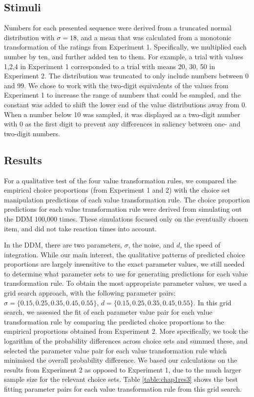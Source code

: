 \documentclass[11pt,a4paper]{article}
\begin{document}
\subsection{Stimuli}

Numbers for each presented sequence were derived from a truncated normal distribution with $\sigma=18$, and a mean that was calculated from a monotonic transformation of the ratings from Experiment 1. Specifically, we multiplied each number by ten, and further added ten to them. For example, a trial with values 1,2,4 in Experiment 1 corresponded to a trial with means 20, 30, 50 in Experiment 2. The distribution was truncated to only include numbers between 0 and 99. We chose to work with the two-digit equivalents of the values from Experiment 1 to increase the range of numbers that could be sampled, and the constant was added to shift the lower end of the value distributions away from 0. When a number below 10 was sampled, it was displayed as a two-digit number with 0 as the first digit to prevent any differences in saliency between one- and two-digit numbers.


\subsection{Results}

For a qualitative test of the four value transformation rules, we compared the empirical choice proportions (from Experiment 1 and 2) with the choice set manipulation predictions of each value transformation rule. The choice proportion predictions for each value transformation rule were derived from simulating out the DDM 100,000 times. These simulations focused only on the eventually chosen item, and did not take reaction times into account.

In the DDM, there are two parameters, $\sigma$, the noise, and $d$, the speed of integration. While our main interest, the qualitative patterns of predicted choice proportions are largely insensitive to the exact parameter values, we still needed to determine what parameter sets to use for generating predictions for each value transformation rule. To obtain the most appropriate parameter values, we used a grid search approach, with the following parameter pairs: $\sigma=\{0.15, 0.25, 0.35, 0.45, 0.55\}$, $\textit{d}=\{0.15, 0.25, 0.35, 0.45, 0.55\}$. In this grid search, we assessed the fit of each parameter value pair for each value transformation rule by comparing the predicted choice proportions to the empirical proportions obtained from Experiment 2. More specifically, we took the logarithm of the probability differences across choice sets and summed these, and selected the parameter value pair for each value transformation rule which minimised the overall probability difference. We based our calculations on the results from Experiment 2 as opposed to Experiment 1, due to the much larger sample size for the relevant choice sets. Table \ref{table:chap1res3} shows the best fitting parameter pairs for each value transformation rule from this grid search. 
\end{document}

